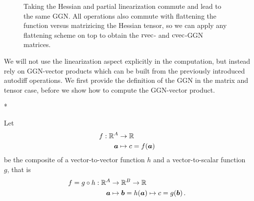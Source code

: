\begin{figure}[!h]
  \centering
  \caption{Taking the Hessian and partial linearization commute and lead to the same GGN. All operations also commute with flattening the function versus matrizicing the Hessian tensor, so we can apply any flattening scheme on top to obtain the $\operatorname{rvec}$- and $\operatorname{cvec}$-GGN matrices.}
\end{figure}

We will not use the linearization aspect explicitly in the computation, but instead rely on GGN-vector products which can be built from the previously introduced autodiff operations.
We first provide the definition of the GGN in the matrix and tensor case, before we show how to compute the GGN-vector product.

\switchcolumn[1]*
\switchcolumn[0]

\begin{setup}\label{setup:composite_vector_to_vector_to_scalar_function}
  Let
  \begin{align*}
    f: {\mathbb{R}}^{A} & \to {\mathbb{R}}
    \\
    {\bm{a}}        & \mapsto c = f({\bm{a}})
  \end{align*}
  be the composite of a vector-to-vector function $h$ and a vector-to-scalar function $g$, that is
  \begin{align*}
    f = g \circ h: {\mathbb{R}}^A & \to {\mathbb{R}}^B \to {\mathbb{R}}
    \\
    {\bm{a}}                  & \mapsto {\bm{b}} = h({\bm{a}}) \mapsto c = g({\bm{b}})\,.
  \end{align*}
\end{setup}


